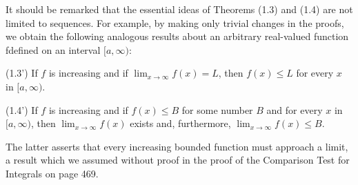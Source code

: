 It should be remarked that the essential ideas of Theorems (1.3) and (1.4) are not limited to sequences. For example, by making only trivial changes in the proofs, we obtain the following analogous results about an arbitrary real-valued function fdefined on an interval $[a, \infty)$:

\begin{theorem} (1.3') 
If $f$ is increasing and if $\lim_{x \rightarrow \infty} f(x) = L$, then $f(x) \leq L$ for every $x$ in $[a, \infty)$.
\end{theorem}
\begin{theorem} (1.4') 
If $f$ is increasing and if $f(x) \leq B$ for some number $B$ and for every $x$ in $[a, \infty)$, then $\lim_{x \rightarrow \infty} f(x)$ exists and, furthermore, $\lim_{x \rightarrow \infty} f(x) \leq B$.
\end{theorem}

The latter asserts that every increasing bounded function must approach a limit, a result which we assumed without proof in the proof of the Comparison Test for Integrals on page 469.



